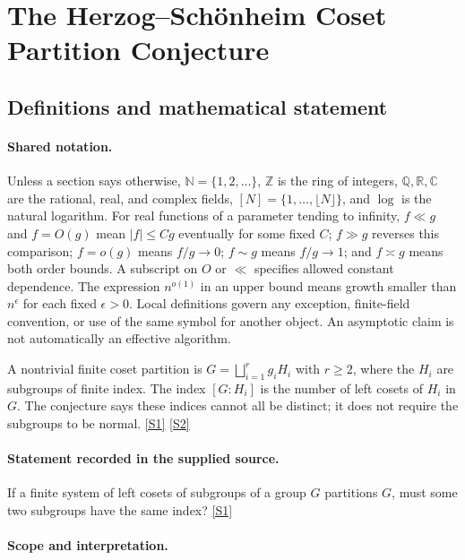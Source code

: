 \documentclass[11pt,a4paper]{article}
\newcommand{\N}{\mathbb{N}}
\newcommand{\Z}{\mathbb{Z}}
\newcommand{\Q}{\mathbb{Q}}
\newcommand{\R}{\mathbb{R}}
\newcommand{\C}{\mathbb{C}}
\newcommand{\sref}[2]{\hyperlink{source:#1:#2}{[S#2]}}
\begin{document}
\section{The Herzog--Schönheim Coset Partition Conjecture}\label{statement}


\subsection{Definitions and mathematical statement}

\paragraph{Shared notation.}Unless a section says otherwise, $\N=\{1,2,\ldots\}$,
$\Z$ is the ring of integers, $\Q,\R,\C$ are the rational, real, and complex
fields, $[N]=\{1,\ldots,\lfloor N\rfloor\}$, and $\log$ is the natural
logarithm. For real functions of a parameter tending to infinity,
$f\ll g$ and $f=O(g)$ mean $|f|\leq Cg$ eventually for some fixed $C$;
$f\gg g$ reverses this comparison; $f=o(g)$ means $f/g\to0$;
$f\sim g$ means $f/g\to1$; and $f\asymp g$ means both order bounds.
A subscript on $O$ or $\ll$ specifies allowed constant dependence.
The expression $n^{o(1)}$ in an upper bound means growth smaller than
$n^\epsilon$ for each fixed $\epsilon>0$. Local definitions govern any
exception, finite-field convention, or use of the same symbol for another
object. An asymptotic claim is not automatically an effective algorithm.



A nontrivial finite coset partition is $G=\bigsqcup_{i=1}^{r}g_iH_i$ with $r\geq2$, where the $H_i$ are subgroups of finite index. The index $[G:H_i]$ is the number of left cosets of $H_i$ in $G$. The conjecture says these indices cannot all be distinct; it does not require the subgroups to be normal. \sref{statement}{1} \sref{statement}{2}

\paragraph{Statement recorded in the supplied source.}
If a finite system of left cosets of subgroups of a group $G$ partitions $G$, must some two subgroups have the same index? \sref{statement}{1}

\paragraph{Scope and interpretation.}
\end{document}
